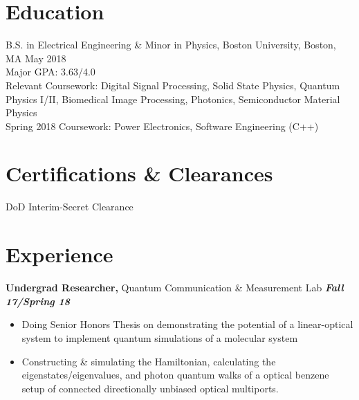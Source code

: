 \documentclass[margin]{res}
\begin{document}
 
 
\address{{\bf Present Address} \\ 39 Buswell St Apt 08 \\ Boston, MA 02215  \\
        (781) 664-7151 \\ Linkedin - www.linkedin.com/in/sonam-ghosh-a6ab09100 }
        
\address{{\bf Permanent Address} \\ 9350 Double R Blvd Apt 3814 \\ Reno, NV 89521 \\
        sonamg@bu.edu }


\begin{resume} 
 

\section{Education} 
B.S. in Electrical Engineering \& Minor in Physics, Boston University, Boston, MA \hfill May 2018 \\
Major GPA: 3.63/4.0 \\
Relevant Coursework: Digital Signal Processing, Solid State Physics, Quantum Physics I/II, Biomedical Image Processing, Photonics, Semiconductor Material Physics \\
Spring 2018 Coursework: Power Electronics, Software Engineering (C++)
 
\section{Certifications \& Clearances}
DoD Interim-Secret Clearance 

\section{Experience}
{\bf Undergrad Researcher,} Quantum Communication \& Measurement Lab \hfill  \textbf{\textit{Fall 17/Spring 18}}
\begin{itemize}  pt
\item Doing Senior Honors Thesis on demonstrating the potential of a linear-optical system to implement quantum simulations of a molecular system
\item Constructing \& simulating the Hamiltonian, calculating the eigenstates/eigenvalues, and photon quantum walks of a optical benzene setup of connected directionally unbiased optical multiports.
\end{itemize}




\end{resume}
\end{document}
